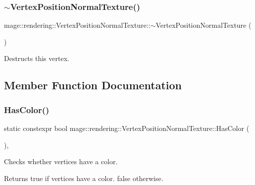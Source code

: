 \subsubsection{\texorpdfstring{$\sim$\+Vertex\+Position\+Normal\+Texture()}{~VertexPositionNormalTexture()}}
{\footnotesize\ttfamily mage\+::rendering\+::\+Vertex\+Position\+Normal\+Texture\+::$\sim$\+Vertex\+Position\+Normal\+Texture (\begin{DoxyParamCaption}{ }\end{DoxyParamCaption})\hspace{0.3cm}{\ttfamily [default]}}

Destructs this vertex. 

\subsection{Member Function Documentation}
\hypertarget{structmage_1_1rendering_1_1_vertex_position_normal_texture_abe3243efa83a9d4d28cf56282ba5b793}{}\label{structmage_1_1rendering_1_1_vertex_position_normal_texture_abe3243efa83a9d4d28cf56282ba5b793} 
\subsubsection{\texorpdfstring{Has\+Color()}{HasColor()}}
{\footnotesize\ttfamily static constexpr bool mage\+::rendering\+::\+Vertex\+Position\+Normal\+Texture\+::\+Has\+Color (\begin{DoxyParamCaption}{ }\end{DoxyParamCaption})\hspace{0.3cm}{\ttfamily [static]}, {\ttfamily [noexcept]}}

Checks whether vertices have a color.

\begin{DoxyReturn}{Returns}
{\ttfamily true} if vertices have a color. {\ttfamily false} otherwise. 
\end{DoxyReturn}
\hypertarget{structmage_1_1rendering_1_1_vertex_position_normal_texture_a5b65b49d120fd660977f8f05b3ee7327}{}\label{structmage_1_1rendering_1_1_vertex_position_normal_texture_a5b65b49d120fd660977f8f05b3ee7327} 
